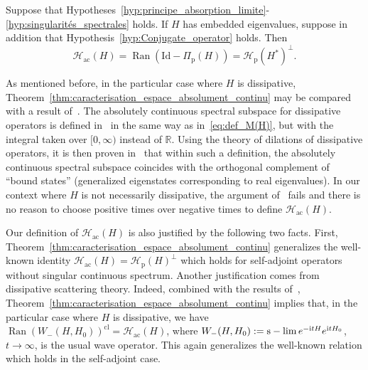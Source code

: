 \documentclass[AHL,Unicode,longabstracts,published]{cedram}
\newcommand{\Hi}{\mathcal{H}}
\newcommand{\R}{\mathbb{R}}
\newcommand{\rmp}{\mathrm{p}}
\newcommand{\acr}{\mathrm{ac}}
\DeclareMathOperator{\slim}{s-lim}
\DeclareMathOperator{\Ran}{Ran}
\newcommand{\Hi}{\mathcal{H}}
\newcommand{\rmp}{\mathrm{p}}
\newcommand{\R}{\mathbb{R}}
\newcommand{\acr}{\mathrm{ac}}
\begin{document}
\begin{theo}\label{thm:caracterisation_espace_absolument_continu}
Suppose that Hypotheses~\ref{hyp:principe_absorption_limite}-\ref{hyp:singularités_spectrales} holds. If $H$ has embedded eigenvalues, suppose in addition that Hypothesis~\ref{hyp:Conjugate_operator} holds. Then
\begin{equation*}
\Hi_\acr(H)=\Ran\left(\mathrm{Id}-\Pi_\rmp(H)\right)=\Hi_\rmp(H^*)^\perp.
\end{equation*}
\end{theo}

As mentioned before, in the particular case where $H$ is dissipative, Theorem~\ref{thm:caracterisation_espace_absolument_continu} may be compared with a result of~\cite{Da80_01}. The absolutely continuous spectral subspace for dissipative operators is defined in~\cite{Da80_01} in the same way as in~\eqref{eq:def_M(H)}, but with the integral taken over $[0,\infty)$ instead of $\R$. Using the theory of dilations of dissipative operators, it is then proven in~\cite{Da80_01} that within such a definition, the absolutely continuous spectral subspace coincides with the orthogonal complement of ``bound states'' (generalized eigenstates corresponding to real eigenvalues). In our context where $H$ is not necessarily dissipative, the argument of~\cite{Da80_01} fails and there is no reason to choose positive times over negative times to define $\Hi_\acr(H)$.

Our definition of $\Hi_\acr(H)$ is also justified by the following two facts. First, Theorem~\ref{thm:caracterisation_espace_absolument_continu} generalizes the well-known identity $
\Hi_\acr(H) = \Hi_{\rmp}(H)^\perp $ which holds for self-adjoint operators without singular continuous spectrum. Another justification comes from dissipative scattering theory. Indeed, combined with the results of~\cite{Da78_01,Da80_01,FaFr18_01,Ma75_01}, Theorem~\ref{thm:caracterisation_espace_absolument_continu} implies that, in the particular case where $H$ is dissipative, we have $\Ran(W_-(H,H_0))^{\mathrm{cl}}=\Hi_\acr(H)$, where $W_-(H,H_0) := \slim \linebreak e^{-\mathrm{i}tH} e^{\mathrm{i}tH_0}$, $t\to\infty$, is the usual wave operator. This again generalizes the well-known relation which holds in the self-adjoint case.
\end{document}

